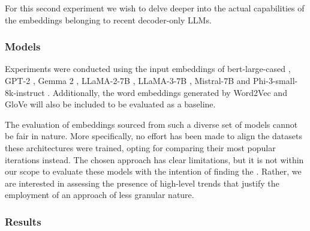 For this second experiment we wish to delve deeper into the actual capabilities of the embeddings belonging to recent decoder-only LLMs.


\subsubsection{Models}


Experiments were conducted using the input embeddings of bert-large-cased , GPT-2 , Gemma 2 , LLaMA-2-7B , LLaMA-3-7B , Mistral-7B  and Phi-3-small-8k-instruct .
Additionally, the word embeddings generated by Word2Vec  and GloVe  will also be included to be evaluated as a baseline.



The evaluation of embeddings sourced from such a diverse set of models cannot be fair in nature.
More specifically, no effort has been made to align the datasets  these architectures were trained, opting for comparing their most popular iterations instead.
The chosen approach has clear limitations, but it is not within our scope to evaluate these models with the intention of finding the .
Rather, we are interested in assessing the presence of high-level trends that justify the employment of an approach of less granular nature.

\subsubsection{Results}

